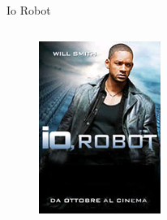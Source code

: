 \documentclass{beamer}
\begin{document}
\begin{frame}{Io Robot}
\begin{columns}
\begin{column}{0.3\linewidth}
\begin{figure}[h!]
\includegraphics[width=0.8\linewidth]{immagini/robot.jpg}
\end{figure}
\end{column}
\end{columns}
\end{frame}
\end{document}
